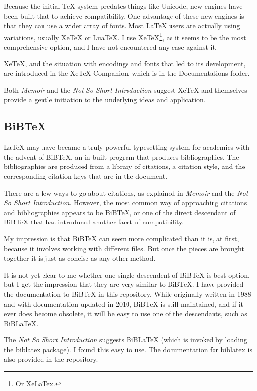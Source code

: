 \documentclass[11pt, oneside]{memoir}
\begin{document}
Because the initial TeX system predates things like Unicode, new engines have been built that to achieve compatibility. One advantage of these new engines is that they can use a wider array of fonts. Most LaTeX users are actually using variations, usually XeTeX or LuaTeX. I use XeTeX\footnote{Or XeLaTex.}, as it seems to be the most comprehensive option, and I have not encountered any case against it.

XeTeX, and the situation with encodings and fonts that led to its development, are introduced in the XeTeX Companion, which is in the Documentations folder.

Both \emph{Memoir} and the \emph{Not So Short Introduction} suggest XeTeX and themselves provide a gentle initiation to the underlying ideas and application.

\subsection{BiBTeX}

LaTeX may have became a truly powerful typesetting system for academics with the advent of BiBTeX, an in-built program that produces bibliographies. The bibliographies are produced from a library of citations, a citation style, and the corresponding citation keys that are in the document.

There are a few ways to go about citations, as explained in \emph{Memoir} and the \emph{Not So Short Introduction}. However, the most common way of approaching citations and bibliographies appears to be BiBTeX, or one of the direct descendant of BiBTeX that has introduced another facet of compatibility.

My impression is that BiBTeX can seem more complicated than it is, at first, because it involves working with different files. But once the pieces are brought together it is just as concise as any other method.

It is not yet clear to me whether one single descendent of BiBTeX is best option, but I get the impression that they are very similar to BiBTeX. I have provided the documentation to BiBTeX in this repository. While originally written in 1988 and with documentation updated in 2010, BiBTeX is still maintained, and if it ever does become obsolete, it will be easy to use one of the descendants, such as BiBLaTeX.

The \emph{Not So Short Introduction} suggests BiBLaTeX (which is invoked by loading the biblatex package). I found this easy to use. The documentation for biblatex is also provided in the repository.
\end{document}
